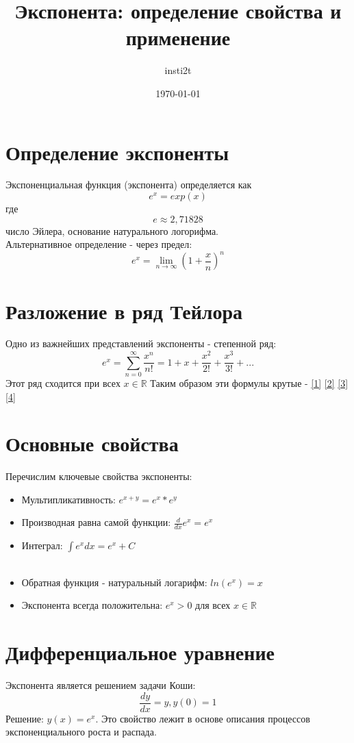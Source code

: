 \documentclass[12pt,a4paper]{article}
\title{Экспонента: определение свойства и применение}
\author{insti2t}
\date{\today}
\begin{document}
\maketitle

\section{Определение экспоненты}
Экспоненциальная функция (экспонента) определяется как
\begin{equation} \label{1}
	e^x=exp(x)
\end{equation}
где 
\begin{equation}\label{2}
 e\approx2,71828
\end{equation}
число Эйлера, основание натурального логорифма.
\\
Альтернативное определение - через предел:
\begin{equation}\label{3}
	 e^x=\lim_{n \to \infty}(1+\frac{x}{n})^n
\end{equation}

\section{Разложение в ряд Тейлора}
Одно из важнейших представлений экспоненты - степенной ряд:
\begin{equation}\label{4}
	e^x=\sum_{n=0}^{\infty}\frac{x^n}{n!}=1+x+\frac{x^2}{2!}+\frac{x^3}{3!}+...
\end{equation}
Этот ряд сходится при всех $x \in \mathbb{R}$
Таким образом эти формулы крутые - \ref{1} \ref{2} \ref{3} \ref{4}
\section{Основные свойства}
Перечислим ключевые свойства экспоненты:
\begin{itemize}
	\item Мультипликативность: $e^{x+y}=e^x*e^y$
	\item Производная равна самой функции: $\frac{d}{dx}e^x=e^x$
	\item Интеграл: $\int e^xdx=e^x+C$
	\\
	\\
	\item Обратная функция - натуральный логарифм: $ln(e^x)=x$
	\item Экспонента всегда положительна: $e^x > 0$ для всех $x \in \mathbb{R}$
\end{itemize}
\section{Дифференциальное уравнение}
Экспонента является решением задачи Коши:
\begin{equation}\label{5}
	\frac{dy}{dx}=y, y(0)=1
\end{equation}
Решение: $y(x)=e^x$. Это свойство лежит в основе описания процессов экспоненциального роста и распада.
\end{document}
